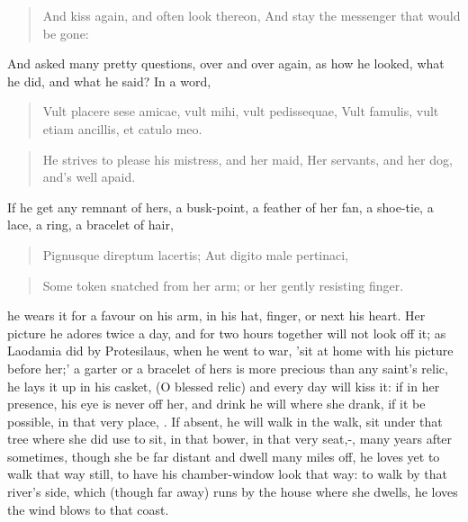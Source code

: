 \begin{verse}%
And kiss again, and often look thereon,
And stay the messenger that would be gone:
\end{verse}%

And asked many pretty questions, over and over again, as how he looked,
what he did, and what he said? In a word,

\begin{latin}
\begin{verse}
Vult placere sese amicae, vult mihi, vult pedissequae,
Vult famulis, vult etiam ancillis, et catulo meo.
\end{verse}
\end{latin}
\translationrule%
\begin{verse}%
He strives to please his mistress, and her maid,
Her servants, and her dog, and's well apaid.
\end{verse}%

If he get any remnant of hers, a busk-point, a feather of her fan, a
shoe-tie, a lace, a ring, a bracelet of hair,

\begin{latin}
\begin{verse}
Pignusque direptum lacertis;
Aut digito male pertinaci,
\end{verse}
\end{latin}
\translationrule%
\begin{verse}%
Some token snatched from her arm;
or her gently resisting finger.
\end{verse}%

he wears it for a favour on his arm, in his hat, finger, or next his
heart. Her picture he adores twice a day, and for two hours together
will not look off it; as Laodamia did by Protesilaus, when he went to
war, 'sit at home with his picture before her;' a garter or a
bracelet of hers is more precious than any saint's relic, he lays it up
in his casket, (O blessed relic) and every day will kiss it: if in her
presence, his eye is never off her, and drink he will where she drank,
if it be possible, in that very place, \etc{}. If absent, he will walk in
the walk, sit under that tree where she did use to sit, in that bower,
in that very seat,-, many years
after sometimes, though she be far distant and dwell many miles off, he
loves yet to walk that way still, to have his chamber-window look that
way: to walk by that river's side, which (though far away) runs by the
house where she dwells, he loves the wind blows to that coast.

